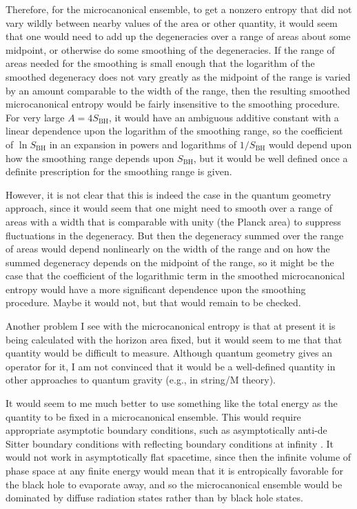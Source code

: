 \documentclass[12pt]{article} \usepackage{latexsym} \textwidth 15cm
\begin{document}
Therefore, for the microcanonical ensemble, to get a nonzero entropy
that did not vary wildly between nearby values of the area or other
quantity, it would seem that one would need to add up the degeneracies
over a range of areas about some midpoint, or otherwise do some
smoothing of the degeneracies.  If the range of areas needed for the
smoothing is small enough that the logarithm of the smoothed degeneracy
does not vary greatly as the midpoint of the range is varied by an
amount comparable to the width of the range, then the resulting
smoothed microcanonical entropy would be fairly insensitive to the
smoothing procedure.  For very large $A = 4S_{\mathrm{BH}}$, it would
have an ambiguous additive constant with a linear dependence upon the
logarithm of the smoothing range, so the coefficient of
$\ln{S_{\mathrm{BH}}}$ in an expansion in powers and logarithms of
$1/S_{\mathrm{BH}}$ would depend upon how the smoothing range depends
upon $S_{\mathrm{BH}}$, but it would be well defined once a definite
prescription for the smoothing range is given.

However, it is not clear that this is indeed the case in the quantum
geometry approach, since it would seem that one might need to smooth
over a range of areas with a width that is comparable with unity (the
Planck area) to suppress fluctuations in the degeneracy.  But then the
degeneracy summed over the range of areas would depend nonlinearly on
the width of the range and on how the summed degeneracy depends on the
midpoint of the range, so it might be the case that the coefficient of
the logarithmic term in the smoothed microcanonical entropy would have
a more significant dependence upon the smoothing procedure.  Maybe it
would not, but that would remain to be checked.

Another problem I see with the microcanonical entropy is that at present
it is being calculated with the horizon area fixed, but it would seem to
me that that quantity would be difficult to measure.  Although quantum
geometry gives an operator for it, I am not convinced that it would be a
well-defined quantity in other approaches to quantum gravity (e.g., in
string/M theory).

It would seem to me much better to use something like the total energy
as the quantity to be fixed in a microcanonical ensemble.  This would
require appropriate asymptotic boundary conditions, such as
asymptotically anti-de Sitter boundary conditions with reflecting
boundary conditions at infinity \cite{HawPage}.  It would not work in
asymptotically flat spacetime, since then the infinite volume of phase
space at any finite energy would mean that it is entropically favorable
for the black hole to evaporate away, and so the microcanonical
ensemble would be dominated by diffuse radiation states rather than by
black hole states.
\end{document}
